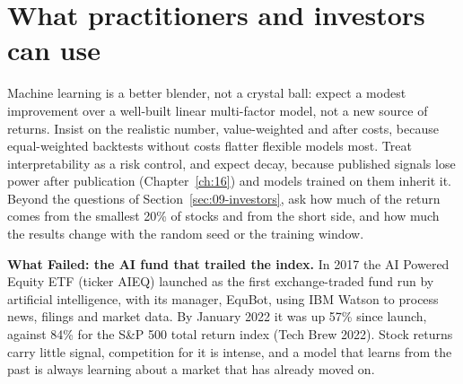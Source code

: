 \section{What practitioners and investors can use}
\label{sec:20-investors}

Machine learning is a better blender, not a crystal ball: expect a modest improvement over a well-built linear multi-factor model, not a new source of returns. Insist on the realistic number, value-weighted and after costs, because equal-weighted backtests without costs flatter flexible models most. Treat interpretability as a risk control, and expect decay, because published signals lose power after publication (Chapter~\ref{ch:16}) and models trained on them inherit it. Beyond the questions of Section~\ref{sec:09-investors}, ask how much of the return comes from the smallest 20\% of stocks and from the short side, and how much the results change with the random seed or the training window.

\begin{callout}
\textbf{What Failed: the AI fund that trailed the index.} In 2017 the AI Powered Equity ETF (ticker AIEQ) launched as the first exchange-traded fund run by artificial intelligence, with its manager, EquBot, using IBM Watson to process news, filings and market data. By January 2022 it was up 57\% since launch, against 84\% for the S\&P 500 total return index (Tech Brew 2022). Stock returns carry little signal, competition for it is intense, and a model that learns from the past is always learning about a market that has already moved on.
\end{callout}

\makeatletter
{}
\makeatother

